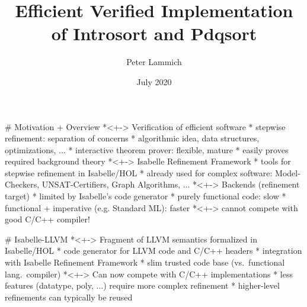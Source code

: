 \documentclass[fleqn]{beamer}
\title{Efficient Verified Implementation of Introsort and Pdqsort}
\author[Peter Lammich]{Peter Lammich}
\institute[UoM] %
{ The University of Manchester}
\date {July 2020}
\begin{document}
% 

\begin{frame}
  \titlepage
\end{frame}


\newcommand{\insertsectitle}{}

\setbeamertemplate{frametitle}{\vspace{.7em}\insertframetitle\hfill \small\raisebox{10pt}{\insertsectitle}}

# Motivation + Overview
  *<+-> Verification of efficient software
    * stepwise refinement: separation of concerns
      * algorithmic idea, data structures, optimizations, ...
    * interactive theorem prover: flexible, mature
      * easily proves required background theory
  *<+-> Isabelle Refinement Framework
    * tools for stepwise refinement in Isabelle/HOL
    * already used for complex software: Model-Checkers, UNSAT-Certifiers, Graph Algorithms, ...
  *<+-> Backends (refinement target)
    * limited by Isabelle's code generator
    * purely functional code: {\color{red}slow}
    * functional + imperative (e.g. Standard ML): {\color{orange}faster}
    *<+-> cannot compete with good C/C++ compiler!

{

# Isabelle-LLVM
  *<+-> Fragment of LLVM semantics formalized in Isabelle/HOL
    * code generator for LLVM code and C/C++ headers
    * integration with Isabelle Refinement Framework
    * slim trusted code base (vs.~functional lang.~compiler)
  *<+-> {\color{blue}Can now compete with C/C++ implementations}
    * less features (datatype, poly, ...) require more complex refinement
    * higher-level refinements can typically be reused

}
\end{document}
